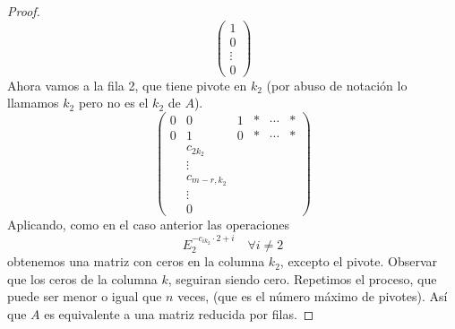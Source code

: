 \documentclass[12pt,a4paper]{book}
\begin{document}
\begin{proof}
        \begin{equation*}
            \begin{pmatrix}
                1\\
                0\\
                \vdots\\
                0
            \end{pmatrix}
        \end{equation*}
        Ahora vamos a la fila 2, que tiene pivote en $k_{2}$ (por abuso de notación lo llamamos $k_{2}$ pero no es el $k_{2}$
        de $A$).
        \begin{equation*}
            \begin{pmatrix}
                0 & 0 & 1 & * & \cdots & *\\
                0 & 1 & 0 & * & \cdots & *\\
                 & c_{2k_{2}} & & & &\\
                 & \vdots & & & &\\
                 & c_{m-r,k_{2}} & & & &\\
                 & \vdots & & & &\\
                 & 0 & & & &
            \end{pmatrix}
        \end{equation*}
        Aplicando, como en el caso anterior las operaciones
        \begin{equation*}
            E_{2}^{-c_{ik_{2}}\cdot2+i}\quad\forall i\neq 2
        \end{equation*}
        obtenemos una matriz con ceros en la columna $k_{2}$, excepto el pivote. Observar que los ceros de la columna $k$,
        seguiran siendo cero. Repetimos el proceso, que puede ser menor o igual que $n$ veces, (que es el número máximo de
        pivotes). Así que $A$ es equivalente a una matriz reducida por filas.
    \end{proof}
\end{document}
